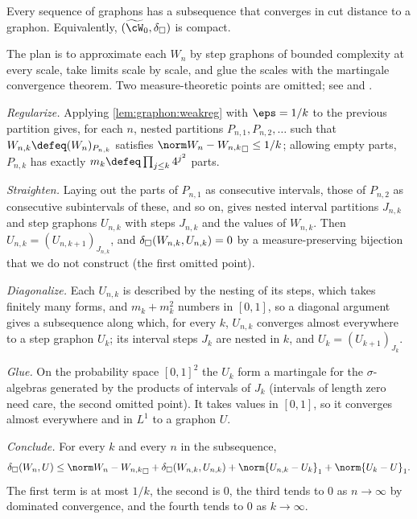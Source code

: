 \begin{refsection}
\begin{theorem}\label{thm:graphon:compact}
Every sequence of graphons has a subsequence that converges in cut distance to a graphon. Equivalently, $(\graphonspace,\graphondelta)$ is compact.
\end{theorem}

\begin{proofsketch}
The plan is to approximate each $W_n$ by step graphons of bounded complexity at every scale, take limits scale by scale, and glue the scales with the martingale convergence theorem. Two measure-theoretic points are omitted; see \textcite{LovaszSzegedy2007} and \textcite[Chapter~4]{Zhao2023}.

\emph{Regularize.} Applying \cref{lem:graphon:weakreg} with $\eps=1/k$ to the previous partition gives, for each $n$, nested partitions $P_{n,1},P_{n,2},\dots$ such that $W_{n,k}\defeq(W_n)_{P_{n,k}}$ satisfies $\graphoncut{W_n-W_{n,k}}\le1/k$; allowing empty parts, $P_{n,k}$ has exactly $m_k\defeq\prod_{j\le k}4^{j^2}$ parts.

\emph{Straighten.} Laying out the parts of $P_{n,1}$ as consecutive intervals, those of $P_{n,2}$ as consecutive subintervals of these, and so on, gives nested interval partitions $J_{n,k}$ and step graphons $U_{n,k}$ with steps $J_{n,k}$ and the values of $W_{n,k}$. Then $U_{n,k}=(U_{n,k+1})_{J_{n,k}}$, and $\delta_{\square}(W_{n,k},U_{n,k})=0$ by a measure-preserving bijection that we do not construct (the first omitted point).

\emph{Diagonalize.} Each $U_{n,k}$ is described by the nesting of its steps, which takes finitely many forms, and $m_k+m_k^2$ numbers in $[0,1]$, so a diagonal argument gives a subsequence along which, for every $k$, $U_{n,k}$ converges almost everywhere to a step graphon $U_k$; its interval steps $J_k$ are nested in $k$, and $U_k=(U_{k+1})_{J_k}$.

\emph{Glue.} On the probability space $[0,1]^2$ the $U_k$ form a martingale for the $\sigma$-algebras generated by the products of intervals of $J_k$ (intervals of length zero need care, the second omitted point). It takes values in $[0,1]$, so it converges almost everywhere and in $L^1$ to a graphon $U$.

\emph{Conclude.} For every $k$ and every $n$ in the subsequence,
\[
  \graphondelta(W_n,U)\le\graphoncut{W_n-W_{n,k}}+\graphondelta(W_{n,k},U_{n,k})+\norm{U_{n,k}-U_k}_1+\norm{U_k-U}_1 .
\]
The first term is at most $1/k$, the second is $0$, the third tends to $0$ as $n\to\infty$ by dominated convergence, and the fourth tends to $0$ as $k\to\infty$.
\end{proofsketch}


\end{refsection}
